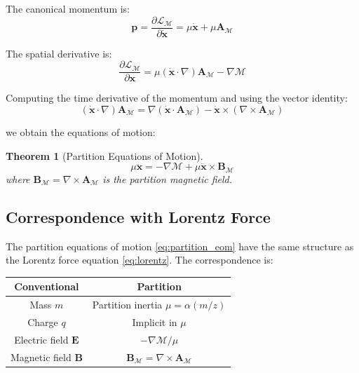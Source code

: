 \documentclass[twocolumn,10pt,a4paper]{article}
\newtheorem{theorem}{Theorem}[section]
\theoremstyle{definition}
\theoremstyle{remark}
\newcommand{\Mdepth}{\mathcal{M}}
\newcommand{\Lagr}{\mathcal{L}}
\newcommand{\Apartition}{\mathbf{A}_{\mathcal{M}}}
\newcommand{\partinert}{\mu}
\begin{document}
The canonical momentum is:
\begin{equation}
    \mathbf{p} = \frac{\partial \Lagr_{\Mdepth}}{\partial \dot{\mathbf{x}}} = \partinert\dot{\mathbf{x}} + \partinert\Apartition
    \label{eq:canonical_momentum}
\end{equation}

The spatial derivative is:
\begin{equation}
    \frac{\partial \Lagr_{\Mdepth}}{\partial \mathbf{x}} = \partinert(\dot{\mathbf{x}} \cdot \nabla)\Apartition - \nabla\Mdepth
    \label{eq:spatial_derivative}
\end{equation}

Computing the time derivative of the momentum and using the vector identity:
\begin{equation}
    (\dot{\mathbf{x}} \cdot \nabla)\Apartition = \nabla(\dot{\mathbf{x}} \cdot \Apartition) - \dot{\mathbf{x}} \times (\nabla \times \Apartition)
\end{equation}

we obtain the equations of motion:

\begin{theorem}[Partition Equations of Motion]
\label{thm:eom}
\begin{equation}
    \boxed{\partinert\ddot{\mathbf{x}} = -\nabla\Mdepth + \partinert\dot{\mathbf{x}} \times \mathbf{B}_{\Mdepth}}
    \label{eq:partition_eom}
\end{equation}
where $\mathbf{B}_{\Mdepth} = \nabla \times \Apartition$ is the partition magnetic field.
\end{theorem}

\subsection{Correspondence with Lorentz Force}

The partition equations of motion \eqref{eq:partition_eom} have the same structure as the Lorentz force equation \eqref{eq:lorentz}. The correspondence is:

\begin{center}
\begin{tabular}{cc}
\toprule
\textbf{Conventional} & \textbf{Partition} \\
\midrule
Mass $m$ & Partition inertia $\partinert = \alpha(m/z)$ \\
Charge $q$ & Implicit in $\partinert$ \\
Electric field $\mathbf{E}$ & $-\nabla\Mdepth/\partinert$ \\
Magnetic field $\mathbf{B}$ & $\mathbf{B}_{\Mdepth} = \nabla \times \Apartition$ \\
\bottomrule
\end{tabular}
\end{center}
\end{document}
